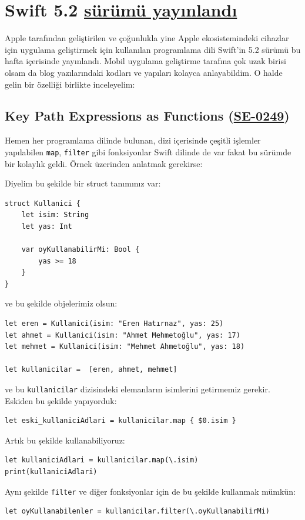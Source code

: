\documentclass[11pt]{article}
\begin{document}
\section{Swift 5.2 \href{https://www.hackingwithswift.com/articles/212/whats-new-in-swift-5-2}{sürümü yayınlandı}}
\label{sec:org45b4e22}
Apple tarafından geliştirilen ve çoğunlukla yine Apple ekosistemindeki
cihazlar için uygulama geliştirmek için kullanılan programlama dili Swift'in
5.2 sürümü bu hafta içerisinde yayınlandı. Mobil uygulama geliştirme tarafına
çok uzak birisi olsam da blog yazılarındaki kodları ve yapıları kolayca
anlayabildim. O halde gelin bir özelliği birlikte inceleyelim:
\subsection{Key Path Expressions as Functions (\href{https://github.com/apple/swift-evolution/blob/master/proposals/0249-key-path-literal-function-expressions.md}{SE-0249})}
\label{sec:orgee9a48e}
Hemen her programlama dilinde bulunan, dizi içerisinde çeşitli işlemler
yapılabilen \texttt{map}, \texttt{filter} gibi fonksiyonlar Swift dilinde de var fakat
bu sürümde bir kolaylık geldi. Örnek üzerinden anlatmak gerekirse:

Diyelim bu şekilde bir struct tanımınız var:
\begin{verbatim}
struct Kullanici {
    let isim: String
    let yas: Int

    var oyKullanabilirMi: Bool {
        yas >= 18
    }
}
\end{verbatim}

ve bu şekilde objelerimiz olsun:
\begin{verbatim}
let eren = Kullanici(isim: "Eren Hatırnaz", yas: 25)
let ahmet = Kullanici(isim: "Ahmet Mehmetoğlu", yas: 17)
let mehmet = Kullanici(isim: "Mehmet Ahmetoğlu", yas: 18)

let kullanicilar =  [eren, ahmet, mehmet]
\end{verbatim}

ve bu \texttt{kullanicilar} dizisindeki elemanların isimlerini getirmemiz gerekir.
Eskiden bu şekilde yapıyorduk:
\begin{verbatim}
let eski_kullaniciAdlari = kullanicilar.map { $0.isim }
\end{verbatim}
Artık bu şekilde kullanabiliyoruz:
\begin{verbatim}
let kullaniciAdlari = kullanicilar.map(\.isim)
print(kullaniciAdlari)
\end{verbatim}
Aynı şekilde \texttt{filter} ve diğer fonksiyonlar için de bu şekilde kullanmak
mümkün:
\begin{verbatim}
let oyKullanabilenler = kullanicilar.filter(\.oyKullanabilirMi)
\end{verbatim}
\end{document}
